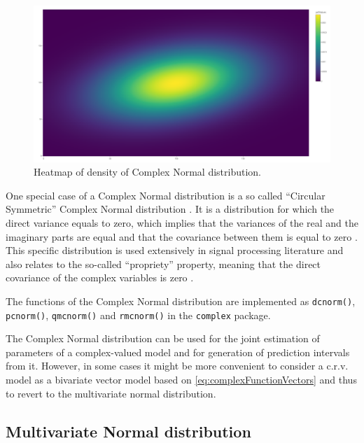 \documentclass[
]{book}
\begin{document}
\begin{figure}
\centering
\includegraphics{./images/plotlyCNormalHeatmap.png}
\caption{\label{fig:plotlyCNormalHeatmap}Heatmap of density of Complex Normal distribution.}
\end{figure}

One special case of a Complex Normal distribution is a so called ``Circular Symmetric'' Complex Normal distribution \citep{Neeser1993}. It is a distribution for which the direct variance equals to zero, which implies that the variances of the real and the imaginary parts are equal and that the covariance between them is equal to zero \citep[ studied its properties in more detail]{Amblard1996}. This specific distribution is used extensively in signal processing literature and also relates to the so-called ``propriety'' property, meaning that the direct covariance of the complex variables is zero \citep{Walden2009, Adali2011}.

The functions of the Complex Normal distribution are implemented as \texttt{dcnorm()}, \texttt{pcnorm()}, \texttt{qmcnorm()} and \texttt{rmcnorm()} in the \texttt{complex} package.

The Complex Normal distribution can be used for the joint estimation of parameters of a complex-valued model and for generation of prediction intervals from it. However, in some cases it might be more convenient to consider a c.r.v. model as a bivariate vector model based on \eqref{eq:complexFunctionVectors} and thus to revert to the multivariate normal distribution.

\hypertarget{MVNorm}{%
\subsection{Multivariate Normal distribution}\label{MVNorm}}
\end{document}
